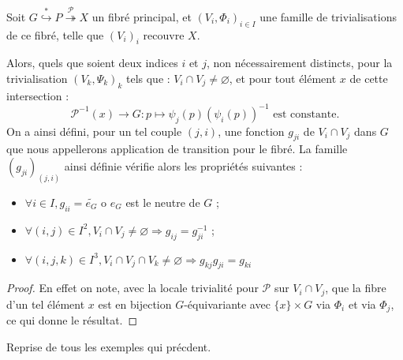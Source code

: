 \begin{prefi}\label{ftr}
Soit $G \overset{\ast}{\hookrightarrow} P \overset{\mathcal{P}}{\twoheadrightarrow} X$ un fibr\'e principal, %
et $(V_i,\Phi_i)_{i \in I}$ une famille de trivialisations de ce fibré, telle que $(V_i)_i$ recouvre $X$.
\par
Alors, quels que soient deux indices $i$ et $j$, non nécessairement distincts, pour la trivialisation $(V_k,\Psi_k)_k$ tels que : $V_i \cap V_j \neq \varnothing$, %
et pour tout élément $x$ de cette intersection :
\[\mathcal{P}^{-1}(x) \rightarrow G : p \mapsto \psi_j(p) (\psi_i (p))^{-1}\text{ est constante.}\]
On a ainsi d\'efini, pour un tel couple $(j,i)$, une fonction $g_{ji}$ de $V_i \cap V_j$ dans $G$ que nous appellerons application de transition pour le fibré. %
La famille $(g_{ji})_{(j,i)}$ ainsi définie vérifie alors les propriétés suivantes :
\begin{itemize}
\item $\forall i \in I , g_{ii} = \tilde{e_G}$ o $e_G$ est le neutre de $G$ ;
\item $\forall (i,j) \in I^2 , V_i \cap V_j \neq \varnothing \Rightarrow g_{ij} = g_{ji}^{-1}$ ;
\item[Propri\'et\'e de cocycle :] $\forall (i,j,k) \in I^3 , V_i \cap V_j \cap V_k \neq \varnothing \Rightarrow g_{kj}g_{ji} = g_{ki}$
\end{itemize}
\end{prefi}

\begin{proof}
En effet on note, avec la locale trivialité pour $\mathcal{P}$ sur $V_i \cap V_j$, que la fibre d'un tel élément $x$ est en bijection $G$-équivariante avec $%
\{x\} \times G$ via $\Phi_i$ et via $\Phi_j$, ce qui donne le résultat.
\end{proof}

Reprise de tous les exemples qui pr\'ecdent.

